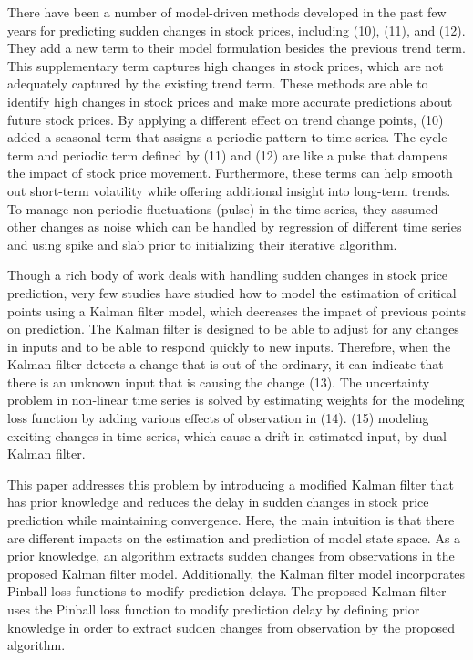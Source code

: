 \documentclass[12pt,a4paper]{article}
\begin{document}
	There have been a number of model-driven methods developed in the past few years for predicting sudden changes in stock prices, including (10), (11), and (12). They add a new term to their model formulation besides the previous trend term. This supplementary term captures high changes in stock prices, which are not adequately captured by the existing trend term. These methods are able to identify high changes in stock prices and make more accurate predictions about future stock prices. By applying a different effect on trend change points, (10) added a seasonal term that assigns a periodic pattern to time series. The cycle term and periodic term defined by (11) and (12) are like a pulse that dampens the impact of stock price movement. Furthermore, these terms can help smooth out short-term volatility while offering additional insight into long-term trends. To manage non-periodic fluctuations (pulse) in the time series, they assumed other changes as noise which can be handled by regression of different time series and using spike and slab prior to initializing their iterative algorithm.
	
	Though a rich body of work deals with handling sudden changes in stock price prediction, very few studies have studied how to model the estimation of critical points using a Kalman filter model, which decreases the impact of previous points on prediction. The Kalman filter is designed to be able to adjust for any changes in inputs and to be able to respond quickly to new inputs. Therefore, when the Kalman filter detects a change that is out of the ordinary, it can indicate that there is an unknown input that is causing the change (13). The uncertainty problem in non-linear time series is solved by estimating weights for the modeling loss function by adding various effects of observation in (14). (15) modeling exciting changes in time series, which cause a drift in estimated input, by dual Kalman filter.
	
	This paper addresses this problem by introducing a modified Kalman filter that has prior knowledge and reduces the delay in sudden changes in stock price prediction while maintaining convergence. Here, the main intuition is that there are different impacts on the estimation and prediction of model state space. As a prior knowledge, an algorithm extracts sudden changes from observations in the proposed Kalman filter model. Additionally, the Kalman filter model incorporates Pinball loss functions to modify prediction delays. The proposed Kalman filter uses the Pinball loss function to modify prediction delay by defining prior knowledge in order to extract sudden changes from observation by the proposed algorithm.
	
\end{document}
